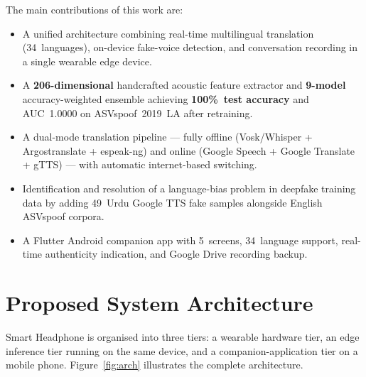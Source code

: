 \documentclass[10pt,twocolumn]{article}
\begin{document}
The main contributions of this work are:
\begin{itemize}[leftmargin=*,itemsep=2pt]
  \item A unified architecture combining real-time multilingual translation
        (34~languages), on-device fake-voice detection, and conversation recording
        in a single wearable edge device.
  \item A \textbf{206-dimensional} handcrafted acoustic feature extractor and
        \textbf{9-model} accuracy-weighted ensemble achieving \textbf{100\%~test
        accuracy} and AUC~1.0000 on ASVspoof~2019~LA after retraining.
  \item A dual-mode translation pipeline — fully offline
        (Vosk/Whisper + Argostranslate + espeak-ng) and online
        (Google Speech + Google Translate + gTTS) — with automatic
        internet-based switching.
  \item Identification and resolution of a language-bias problem in deepfake
        training data by adding 49~Urdu Google TTS fake samples alongside
        English ASVspoof corpora.
  \item A Flutter Android companion app with 5~screens, 34~language support,
        real-time authenticity indication, and Google Drive recording backup.
\end{itemize}

\section{Proposed System Architecture}

Smart Headphone is organised into three tiers: a wearable hardware tier, an edge
inference tier running on the same device, and a companion-application tier on a
mobile phone. Figure~\ref{fig:arch} illustrates the complete architecture.
\end{document}
